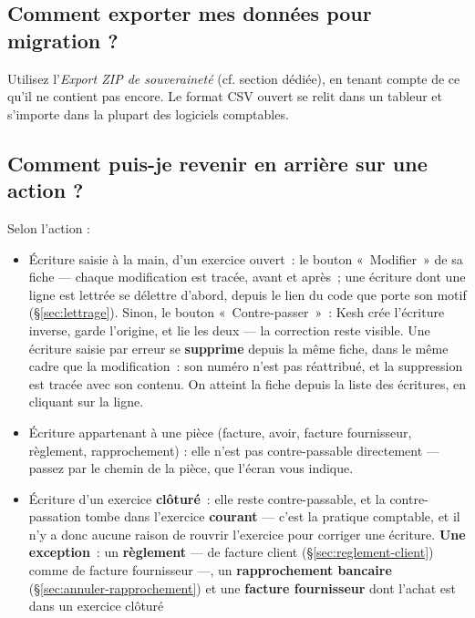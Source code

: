 \documentclass[a4paper,11pt,oneside]{article}
\begin{document}
\subsection{Comment exporter mes données pour migration ?}

Utilisez l'\emph{Export ZIP de souveraineté} (cf. section dédiée), en tenant compte de ce qu'il ne contient pas encore. Le format CSV ouvert se relit dans un tableur et s'importe dans la plupart des logiciels comptables.

\subsection{Comment puis-je revenir en arrière sur une action ?}

Selon l'action :

\begin{itemize}
    \item Écriture saisie à la main, d'un exercice ouvert~: le bouton «~Modifier~» de sa
          fiche --- chaque modification est tracée, avant et après~; une écriture dont une
          ligne est lettrée se délettre d'abord, depuis le lien du code que porte son motif
          (\S\ref{sec:lettrage}). Sinon, le bouton
          «~Contre-passer~»~: Kesh crée l'écriture inverse, garde l'origine, et lie les deux
          --- la correction reste visible. Une écriture saisie par erreur se
          \textbf{supprime} depuis la même fiche, dans le même cadre que la modification~:
          son numéro n'est pas réattribué, et la suppression est tracée avec son contenu.
          On atteint la fiche depuis la liste des écritures, en cliquant sur la ligne.
    \item Écriture appartenant à une pièce (facture, avoir, facture fournisseur,
          règlement, rapprochement) : elle n'est pas contre-passable directement --- passez
          par le chemin de la pièce, que l'écran vous indique.
    \item Écriture d'un exercice \textbf{clôturé}~: elle reste contre-passable, et la
          contre-passation tombe dans l'exercice \textbf{courant} --- c'est la pratique
          comptable, et il n'y a donc aucune raison de rouvrir l'exercice pour corriger une
          écriture. \textbf{Une exception}~: un \textbf{règlement} --- de facture client
          (\S\ref{sec:reglement-client}) comme de facture fournisseur ---, un
          \textbf{rapprochement bancaire} (\S\ref{sec:annuler-rapprochement}) et une
          \textbf{facture fournisseur} dont l'achat est dans un exercice clôturé

\end{itemize}
\end{document}
